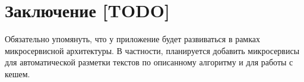 \section*{Заключение [TODO]}

Обязательно упомянуть, что у приложение будет развиваться в рамках микросервисной архитектуры. В частности, планируется добавить микросервисы для автоматической разметки текстов по описанному алгоритму и для работы с кешем.

%
%
%
%
%

\pagebreak